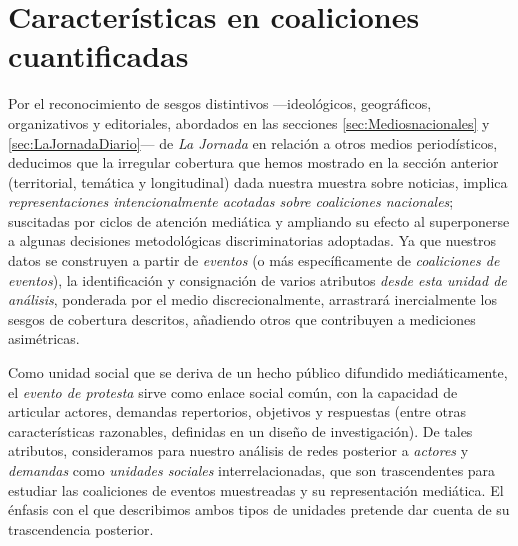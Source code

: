 \documentclass[letterpaper, 11pt]{book}
\theoremstyle{definition}
\theoremstyle{remark}
\begin{document}
\section{Características en coaliciones cuantificadas}
\label{sec:CaracterísticasCuantificadas}

Por el reconocimiento de sesgos distintivos ---ideológicos, geográficos, organizativos y editoriales, abordados en las secciones \ref{sec:Mediosnacionales} y \ref{sec:LaJornadaDiario}--- de \emph{La Jornada} en relación a otros medios periodísticos, deducimos que la irregular cobertura que hemos mostrado en la sección anterior (territorial, temática y longitudinal) dada nuestra muestra sobre noticias, implica \emph{representaciones intencionalmente acotadas sobre coaliciones nacionales}; suscitadas por ciclos de atención mediática y ampliando su efecto al superponerse a algunas decisiones metodológicas discriminatorias adoptadas. 
Ya que nuestros datos se construyen a partir de \emph{eventos} (o más específicamente de \emph{coaliciones de eventos}), la identificación y consignación de varios atributos \emph{desde esta unidad de análisis}, ponderada por el medio discrecionalmente, arrastrará inercialmente los sesgos de cobertura descritos, añadiendo otros que contribuyen a mediciones asimétricas. 


Como unidad social que se deriva de un hecho público difundido mediáticamente, el \emph{evento de protesta} sirve como enlace social común, con la capacidad de articular actores, demandas repertorios, objetivos y respuestas (entre otras características razonables, definidas en un diseño de investigación). 
De tales atributos, consideramos para nuestro análisis de redes posterior a \emph{actores} y \emph{demandas} como \emph{unidades sociales} interrelacionadas, que son trascendentes para estudiar las coaliciones de eventos muestreadas y su representación mediática. 
El énfasis con el que describimos ambos tipos de unidades pretende dar cuenta de su trascendencia posterior. 
\end{document}
